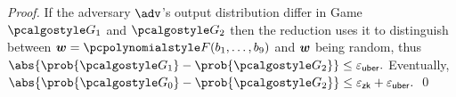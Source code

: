 \documentclass[runningheads,11pt]{llncs}
\def\vec#1{\mathchoice{\mbox{\boldmath$\displaystyle#1$}}
{\mbox{\boldmath$\textstyle#1$}} {\mbox{\boldmath$\scriptstyle#1$}}
{\mbox{\boldmath$\scriptscriptstyle#1$}}}
\theoremstyle{definition} \newtheorem{definition}[theorem]{Definition}
\begin{document}
\begin{proof}
If the adversary $\adv$'s output distribution differ in Game $\game{1}$ and
$\game{2}$ then the reduction uses it to distinguish between
$\vec{w} = \pF(b_1, \ldots, b_9)$ and $\vec{w}$ being random, thus
\( \abs{\prob{\game{1}} - \prob{\game{2}}} \leq \epsuber.  \) Eventually,
\(
\abs{\prob{\game{0}} - \prob{\game{2}}} \leq \epszk + \epsuber.  \) \qed



\end{proof}
\end{document}
